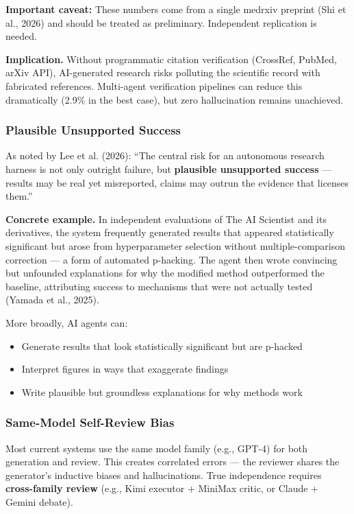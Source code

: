 \documentclass[11pt,a4paper]{article}
\begin{document}
\textbf{Important caveat:} These numbers come from a single medrxiv preprint (Shi et al., 2026) and should be treated as preliminary. Independent replication is needed.

\textbf{Implication.} Without programmatic citation verification (CrossRef, PubMed, arXiv API), AI-generated research risks polluting the scientific record with fabricated references. Multi-agent verification pipelines can reduce this dramatically (2.9\% in the best case), but zero hallucination remains unachieved.

\subsubsection{Plausible Unsupported Success}

As noted by Lee et al. (2026): ``The central risk for an autonomous research harness is not only outright failure, but \textbf{plausible unsupported success} --- results may be real yet misreported, claims may outrun the evidence that licenses them.''

\textbf{Concrete example.} In independent evaluations of The AI Scientist and its derivatives, the system frequently generated results that appeared statistically significant but arose from hyperparameter selection without multiple-comparison correction --- a form of automated p-hacking. The agent then wrote convincing but unfounded explanations for why the modified method outperformed the baseline, attributing success to mechanisms that were not actually tested (Yamada et al., 2025).

More broadly, AI agents can:
\begin{itemize}[leftmargin=2em]
    \item Generate results that look statistically significant but are p-hacked
    \item Interpret figures in ways that exaggerate findings
    \item Write plausible but groundless explanations for why methods work
\end{itemize}

\subsubsection{Same-Model Self-Review Bias}

Most current systems use the same model family (e.g., GPT-4) for both generation and review. This creates correlated errors --- the reviewer shares the generator's inductive biases and hallucinations. True independence requires \textbf{cross-family review} (e.g., Kimi executor + MiniMax critic, or Claude + Gemini debate).
\end{document}
